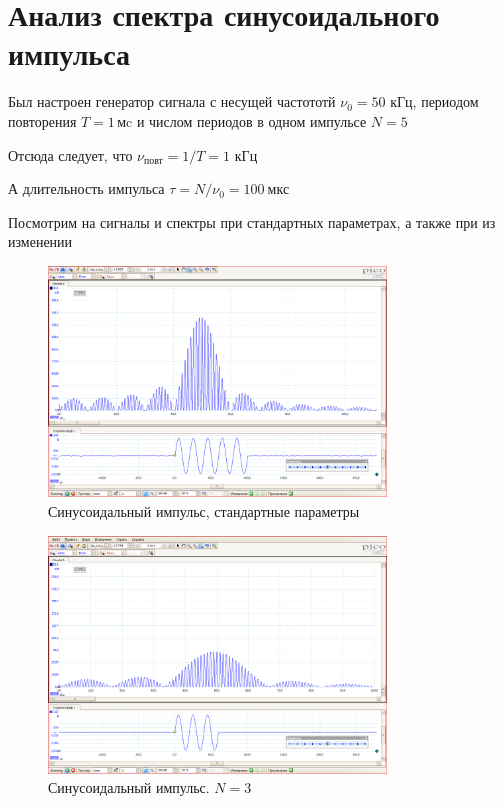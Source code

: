 \documentclass[a4paper]{article}
\begin{document}

\section{Анализ спектра синусоидального импульса}

Был настроен генератор сигнала с несущей частототй $\nu_0 = 50$ кГц, 
периодом повторения \( T = 1 \, \text{мc} \) и числом периодов в одном импульсе \( N = 5 \ \)

Отсюда следует, что $\nu_\text{повт} = 1/T = 1$ кГц

А длительность импульса \( \tau = N / \nu_0 = 100 \ \text{мкс} \)

Посмотрим на сигналы и спектры при стандартных параметрах, а также при из изменении 

\begin{figure}[h!]
\centering
\includegraphics[width=0.8\textwidth]{Цуг стандарт.PNG}
\caption{Синусоидальный импульс, стандартные параметры}
\end{figure}

\begin{figure}[h!]
\centering
\includegraphics[width=0.8\textwidth]{Цуг n=3.PNG}
\caption{Синусоидальный импульс. $N = 3$}
\end{figure}
\end{document}

